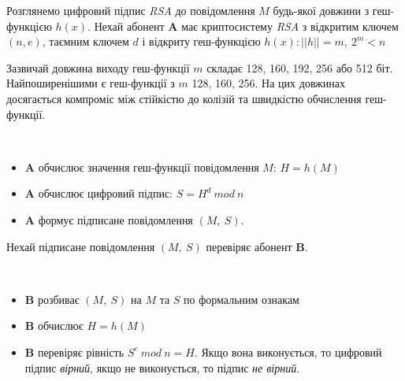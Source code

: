 Розглянемо цифровий підпис \textit{RSA} до повідомлення \( M \) будь-якої довжини з геш-функцією \( h(x) \).
Нехай абонент \textbf{A} має криптосистему \textit{RSA} з відкритим ключем \( \left( n, e \right) \), таємним ключем \( d \) і відкриту геш-функцією \( h(x) \colon ||h|| = m,\ 2^{m} < n \)
\begin{remark}
Зазвичай довжина виходу геш-функції \( m \) складає 128, 160, 192, 256 або 512 біт. Найпоширенішими є геш-функції з \( m \) 128, 160, 256. На цих довжинах досягається компроміс між стійкістю до колізій та швидкістю обчислення геш-функції.
\end{remark}
\begin{algorithm}\ 
\begin{itemize}
\item \textbf{A} обчислює значення геш-функції повідомлення \( M \): \( H = h(M) \)
\item \textbf{A} обчислює цифровий підпис: \( S = H^d\ mod\ n \)
\item \textbf{A} формує підписане повідомлення \( (M,\ S) \).
\end{itemize}
\end{algorithm}
Нехай підписане повідомлення \( (M,\ S) \) перевіряє абонент \textbf{B}.
\begin{algorithm}\ 
\begin{itemize}
\item \textbf{B} розбиває \( (M,\ S) \) на \( M \) та \( S \) по формальним ознакам
\item \textbf{B} обчислює \( H = h(M) \)
\item \textbf{B} перевіряє рівність \( S^e\ mod\ n = H \). Якщо вона виконується, то цифровий підпис \textit{вірний}, якщо не виконується, то підпис \textit{не вірний}.
\end{itemize}
\end{algorithm}

